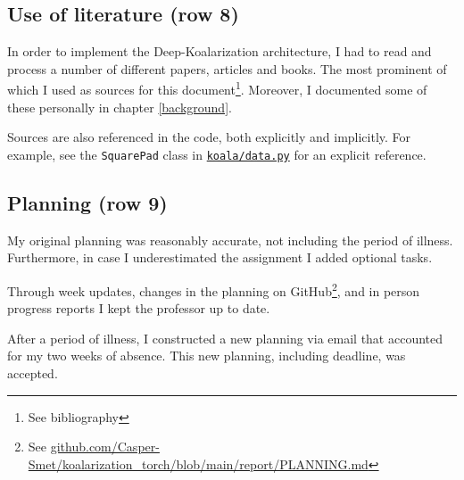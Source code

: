 \documentclass{article}
\begin{document}
        
    \subsection{Use of literature (row 8)}
        In order to implement the Deep-Koalarization architecture, I had to read and process a number of different papers, articles and books. The most prominent of which I used as sources for this document\footnote{See bibliography}. Moreover, I documented some of these personally in chapter \ref{background}.
        
        Sources are also referenced in the code, both explicitly and implicitly. For example, see the \texttt{SquarePad} class in \href{https://github.com/Casper-Smet/koalarization\_torch/blob/main/koala/data.py#L36}{\texttt{koala/data.py}} for an explicit reference.
        
    \subsection{Planning (row 9)}
    
        My original planning was reasonably accurate, not including the period of illness. Furthermore, in case I underestimated the assignment I added optional tasks.
        
        Through week updates, changes in the planning on GitHub\footnote{See \href{https://github.com/Casper-Smet/koalarization_torch/blob/main/report/PLANNING.md}{github.com/Casper-Smet/koalarization\_torch/blob/main/report/PLANNING.md}}, and in person progress reports I kept the professor up to date.
        
        After a period of illness, I constructed a new planning via email that accounted for my two weeks of absence. This new planning, including deadline, was accepted.
    
\end{document}
